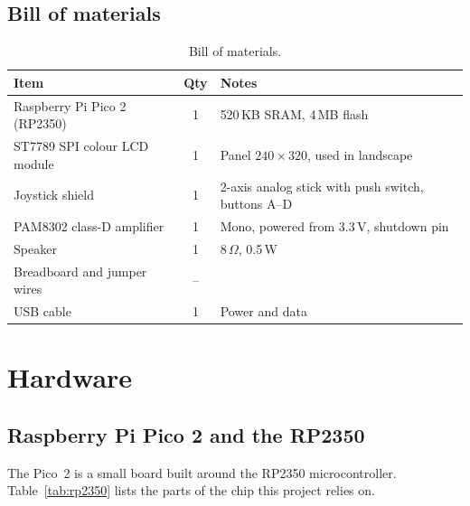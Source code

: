 \documentclass[11pt,a4paper]{article}
\begin{document}
\subsection{Bill of materials}
\begin{table}[H]
\centering
\caption{Bill of materials.}
\begin{tabular}{lcl}
\toprule
\textbf{Item} & \textbf{Qty} & \textbf{Notes} \\
\midrule
Raspberry Pi Pico 2 (RP2350) & 1 & 520\,KB SRAM, 4\,MB flash \\
ST7789 SPI colour LCD module & 1 & Panel $240\times320$, used in landscape \\
Joystick shield & 1 & 2-axis analog stick with push switch, buttons A--D \\
PAM8302 class-D amplifier & 1 & Mono, powered from 3.3\,V, shutdown pin \\
Speaker & 1 & 8\,$\Omega$, 0.5\,W \\
Breadboard and jumper wires & -- & \\
USB cable & 1 & Power and data \\
\bottomrule
\end{tabular}
\end{table}

\section{Hardware}\label{sec:hardware}

\subsection{Raspberry Pi Pico 2 and the RP2350}\label{sec:pico}
The Pico~2 is a small board built around the RP2350 microcontroller.
Table~\ref{tab:rp2350} lists the parts of the chip this project relies on.
\end{document}
